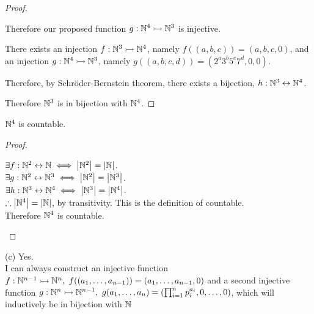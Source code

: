 \documentclass[a4paper, 11pt]{report}
\begin{document}
\begin{proof}
\begin{list}{}{\setlength{\leftmargin}{1in}\setlength{\topsep}{0pt}}
    Therefore our proposed function $g:\mathbb{N}^4\rightarrowtail\mathbb{N}^3$ is injective. \\
  \end{list}

  There exists an injection $f:\mathbb{N}^3\rightarrowtail\mathbb{N}^4$, namely $f((a,b,c)) = (a,b,c,0)$, and an injection $g:\mathbb{N}^4\rightarrowtail\mathbb{N}^3$, namely $g((a,b,c,d)) = (2^a3^b5^c7^d, 0, 0)$.

  Therefore, by Schr\"oder-Bernstein theorem, there exists a bijection, $h:\mathbb{N}^3\leftrightarrow\mathbb{N}^4$.

  Therefore $\mathbb{N}^3$ is in bijection with $\mathbb{N}^4$.
\end{proof} 

\Corol $\mathbb{N}^4$ is countable.
\begin{proof}
  \begin{list}{\setlength{\leftmargin}{1in}\setlength{\topsep}{0pt}}\item 
    $\exists f:\mathbb{N}^2\leftrightarrow\mathbb{N}\iff\left| \mathbb{N}^2 \right|=\left| \mathbb{N} \right|$. \\
    $\exists g:\mathbb{N}^2\leftrightarrow\mathbb{N}^3\iff\left| \mathbb{N}^2 \right|=\left| \mathbb{N}^3 \right|$. \\
    $\exists h:\mathbb{N}^3\leftrightarrow\mathbb{N}^4\iff\left| \mathbb{N}^3 \right|=\left| \mathbb{N}^4 \right|$. \\
    $\therefore\left| \mathbb{N}^4 \right|=\left| \mathbb{N} \right|$, by transitivity. This is the definition of countable. \\
    Therefore $\mathbb{N}^4$ is countable.
  \end{list}
\end{proof}

\sol (c) Yes. \\

I can always construct an injective function $f:\mathbb{N}^{n-1}\rightarrowtail\mathbb{N}^n,\ f((a_1,\dots,a_{n-1})) = (a_1,\dots,a_{n-1},0)$ and a second injective function $g:\bbn^n\injto\bbn^{n-1},\ g(a_1,\dots,a_n)=\bracks{\prod_{i=1}^n p_i^{a_i},0,\dots,0}$, which will inductively be in bijection with $\mathbb{N}$

\newpage
{}
\sol
\end{document}
